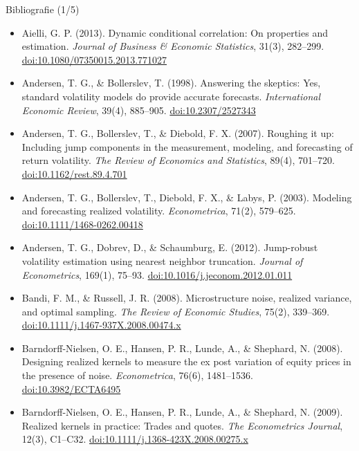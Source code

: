 \begin{frame}{Bibliografie (1/5)}
\itemsize{\tiny}
\begin{itemize}
    \item Aielli, G. P. (2013). Dynamic conditional correlation: On properties and estimation. \textit{Journal of Business \& Economic Statistics}, 31(3), 282--299. \href{https://doi.org/10.1080/07350015.2013.771027}{doi:10.1080/07350015.2013.771027}
    \item Andersen, T. G., \& Bollerslev, T. (1998). Answering the skeptics: Yes, standard volatility models do provide accurate forecasts. \textit{International Economic Review}, 39(4), 885--905. \href{https://doi.org/10.2307/2527343}{doi:10.2307/2527343}
    \item Andersen, T. G., Bollerslev, T., \& Diebold, F. X. (2007). Roughing it up: Including jump components in the measurement, modeling, and forecasting of return volatility. \textit{The Review of Economics and Statistics}, 89(4), 701--720. \href{https://doi.org/10.1162/rest.89.4.701}{doi:10.1162/rest.89.4.701}
    \item Andersen, T. G., Bollerslev, T., Diebold, F. X., \& Labys, P. (2003). Modeling and forecasting realized volatility. \textit{Econometrica}, 71(2), 579--625. \href{https://doi.org/10.1111/1468-0262.00418}{doi:10.1111/1468-0262.00418}
    \item Andersen, T. G., Dobrev, D., \& Schaumburg, E. (2012). Jump-robust volatility estimation using nearest neighbor truncation. \textit{Journal of Econometrics}, 169(1), 75--93. \href{https://doi.org/10.1016/j.jeconom.2012.01.011}{doi:10.1016/j.jeconom.2012.01.011}
    \item Bandi, F. M., \& Russell, J. R. (2008). Microstructure noise, realized variance, and optimal sampling. \textit{The Review of Economic Studies}, 75(2), 339--369. \href{https://doi.org/10.1111/j.1467-937X.2008.00474.x}{doi:10.1111/j.1467-937X.2008.00474.x}
    \item Barndorff-Nielsen, O. E., Hansen, P. R., Lunde, A., \& Shephard, N. (2008). Designing realized kernels to measure the ex post variation of equity prices in the presence of noise. \textit{Econometrica}, 76(6), 1481--1536. \href{https://doi.org/10.3982/ECTA6495}{doi:10.3982/ECTA6495}
    \item Barndorff-Nielsen, O. E., Hansen, P. R., Lunde, A., \& Shephard, N. (2009). Realized kernels in practice: Trades and quotes. \textit{The Econometrics Journal}, 12(3), C1--C32. \href{https://doi.org/10.1111/j.1368-423X.2008.00275.x}{doi:10.1111/j.1368-423X.2008.00275.x}

\end{itemize}
\end{frame}
